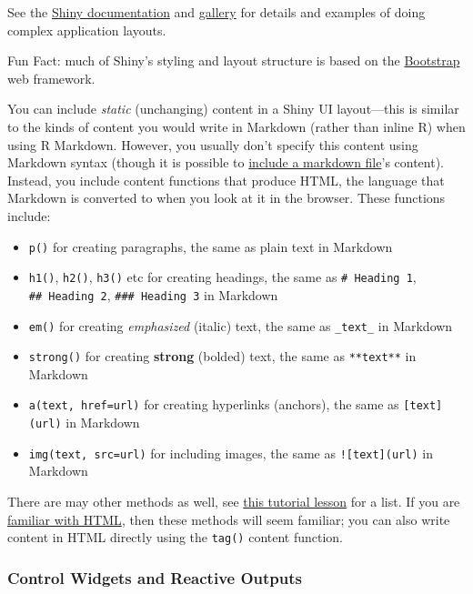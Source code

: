 \documentclass[]{book}
\providecommand{\tightlist}{%
  \setlength{\itemsep}{0pt}\setlength{\parskip}{0pt}}
\theoremstyle{definition}
\theoremstyle{definition}
\theoremstyle{remark}
\begin{document}
See the \href{http://shiny.rstudio.com/reference/shiny/latest/}{Shiny
documentation} and \href{http://shiny.rstudio.com/gallery/}{gallery} for
details and examples of doing complex application layouts.

Fun Fact: much of Shiny's styling and layout structure is based on the
\href{http://getbootstrap.com/}{Bootstrap} web framework.

You can include \emph{static} (unchanging) content in a Shiny UI
layout---this is similar to the kinds of content you would write in
Markdown (rather than inline R) when using R Markdown. However, you
usually don't specify this content using Markdown syntax (though it is
possible to
\href{http://shiny.rstudio.com/reference/shiny/latest/include.html}{include
a markdown file}'s content). Instead, you include content functions that
produce HTML, the language that Markdown is converted to when you look
at it in the browser. These functions include:

\begin{itemize}
\tightlist
\item
  \texttt{p()} for creating paragraphs, the same as plain text in
  Markdown
\item
  \texttt{h1()}, \texttt{h2()}, \texttt{h3()} etc for creating headings,
  the same as \texttt{\#\ Heading\ 1}, \texttt{\#\#\ Heading\ 2},
  \texttt{\#\#\#\ Heading\ 3} in Markdown
\item
  \texttt{em()} for creating \emph{emphasized} (italic) text, the same
  as \texttt{\_text\_} in Markdown
\item
  \texttt{strong()} for creating \textbf{strong} (bolded) text, the same
  as \texttt{**text**} in Markdown
\item
  \texttt{a(text,\ href=\textquotesingle{}url\textquotesingle{})} for
  creating hyperlinks (anchors), the same as \texttt{{[}text{]}(url)} in
  Markdown
\item
  \texttt{img(text,\ src=\textquotesingle{}url\textquotesingle{})} for
  including images, the same as \texttt{!{[}text{]}(url)} in Markdown
\end{itemize}

There are may other methods as well, see
\href{http://shiny.rstudio.com/tutorial/lesson2/}{this tutorial lesson}
for a list. If you are
\href{https://info343-au16.github.io/\#/tutorials/html}{familiar with
HTML}, then these methods will seem familiar; you can also write content
in HTML directly using the \texttt{tag()} content function.

\subsubsection{Control Widgets and Reactive
Outputs}\label{control-widgets-and-reactive-outputs}
\end{document}
